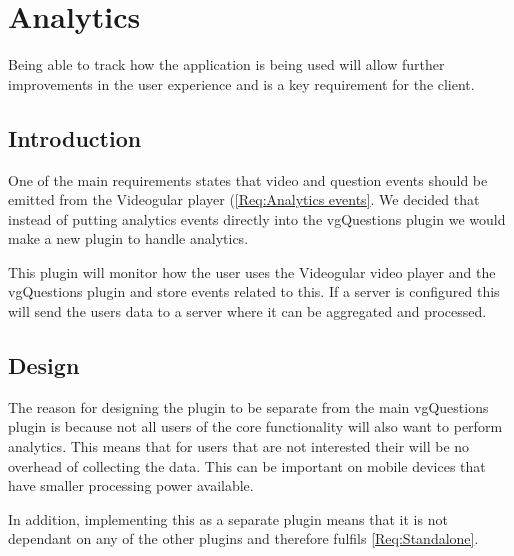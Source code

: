 
\chapter{Analytics} \label{Chapter: Analytics}

\begin{preamble}
	Being able to track how the application is being used will allow further improvements in the user experience and is a key requirement for the client.
\end{preamble}

\section{Introduction}

One of the main requirements states  that video and question events should be emitted from the Videogular player (\cref{Req:Analytics events}. We decided that instead of putting analytics events directly into the \gls{vgQuestions} plugin we would make a new plugin to handle analytics.

This plugin will monitor how the user uses the \gls{Videogular} video player and the \gls{vgQuestions} plugin and store events related to this. If a server is configured this will send the users data to a server where it can be aggregated and processed.

\section{Design}

The reason for designing the plugin to be separate from the main vgQuestions plugin is because not all users of the core functionality will also want to perform analytics. This means that for users that are not interested their will be no overhead of collecting the data. This can be important on mobile devices that have smaller processing power available.

In addition, implementing this as a separate plugin means that it is not dependant on any of the other plugins and therefore fulfils \cref{Req:Standalone}.

